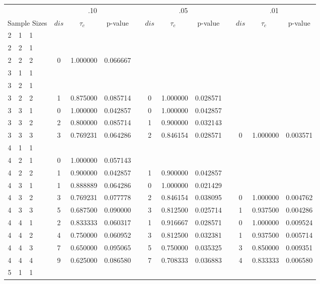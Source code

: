 \begin{appendix}
\begin{longtable}[h]{rrrccccccccccccc}
   & && & &  \multicolumn{3}{c}{.10} &&  \multicolumn{3}{c}{.05} &&  \multicolumn{3}{c}{.01} \\  \cline{6-8} \cline{10-12} \cline{14-16}
\multicolumn{5}{c}{Sample Sizes} &  $dis$  & $\tau_c$ \, & p-value &&  $dis$  & $\tau_c$ \, & p-value &&  $dis$  & $\tau_c$ \,& p-value \\ \hline
2	&	1	&	1	&&&		&		&		&&		&		&		&&		&		&		\\
2	&	2	&	1	&&&		&		&		&&		&		&		&&		&		&		\\
2	&	2	&	2	&&&	0	&	1.000000	&	0.066667	&&		&		&		&&		&		&		\\
3	&	1	&	1	&&&		&		&		&&		&		&		&&		&		&		\\
3	&	2	&	1	&&&		&		&		&&		&		&		&&		&		&		\\
3	&	2	&	2	&&&	1	&	0.875000	&	0.085714	&&	0	&	1.000000	&	0.028571	&&		&		&		\\
3	&	3	&	1	&&&	0	&	1.000000	&	0.042857	&&	0	&	1.000000	&	0.042857	&&		&		&		\\
3	&	3	&	2	&&&	2	&	0.800000	&	0.085714	&&	1	&	0.900000	&	0.032143	&&		&		&		\\
3	&	3	&	3	&&&	3	&	0.769231	&	0.064286	&&	2	&	0.846154	&	0.028571	&&	0	&	1.000000	&	0.003571	\\
4	&	1	&	1	&&&		&		&		&&		&		&		&&		&		&		\\
4	&	2	&	1	&&&	0	&	1.000000	&	0.057143	&&		&		&		&&		&		&		\\
4	&	2	&	2	&&&	1	&	0.900000	&	0.042857	&&	1	&	0.900000	&	0.042857	&&		&		&		\\
4	&	3	&	1	&&&	1	&	0.888889	&	0.064286	&&	0	&	1.000000	&	0.021429	&&		&		&		\\
4	&	3	&	2	&&&	3	&	0.769231	&	0.077778	&&	2	&	0.846154	&	0.038095	&&	0	&	1.000000	&	0.004762	\\
4	&	3	&	3	&&&	5	&	0.687500	&	0.090000	&&	3	&	0.812500	&	0.025714	&&	1	&	0.937500	&	0.004286	\\
4	&	4	&	1	&&&	2	&	0.833333	&	0.060317	&&	1	&	0.916667	&	0.028571	&&	0	&	1.000000	&	0.009524	\\
4	&	4	&	2	&&&	4	&	0.750000	&	0.060952	&&	3	&	0.812500	&	0.032381	&&	1	&	0.937500	&	0.005714	\\
4	&	4	&	3	&&&	7	&	0.650000	&	0.095065	&&	5	&	0.750000	&	0.035325	&&	3	&	0.850000	&	0.009351	\\
4	&	4	&	4	&&&	9	&	0.625000	&	0.086580	&&	7	&	0.708333	&	0.036883	&&	4	&	0.833333	&	0.006580	\\
5	&	1	&	1	&&&		&		&		&&		&		&		&&		&		&		\\

\end{longtable}
\end{appendix}
